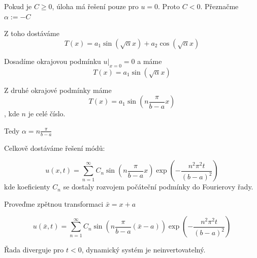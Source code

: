 \documentclass[../main.tex]{subfiles}
\begin{document}
\begin{example}
    Pokud je $C\geq 0$, úloha má řešení pouze pro $u=0$. Proto $C < 0$. Přeznačme $\alpha := -C$

    Z toho dostáváme 
    \begin{equation}
        T(x) = a_1 \sin(\sqrt{\alpha}x) + a_2 \cos(\sqrt{\alpha}x)
    \end{equation}

    Dosadíme okrajovou podmínku $u|_{x=0} = 0$ a máme 
    \begin{equation}
        T(x) = a_1 \sin(\sqrt{\alpha}x)
    \end{equation}

    Z druhé okrajové podmínky máme
    \begin{equation}
        T(x) = a_1 \sin(n\frac{\pi}{b-a}x)
    \end{equation},
    kde $n$ je celé číslo.
 
    Tedy $\alpha = n\frac{\pi}{b-a}$

    Celkově dostáváme řešení módů: 

    \begin{equation}
        u(x,t) = \sum_{n=1}^{\infty} C_n \sin(n\frac{\pi}{b-a}x) \exp(-\frac{n^2\pi^2t}{(b-a)^2})
    \end{equation}
    kde koeficienty $C_n$ se dostaly rozvojem počáteční podmínky do Fourierovy řady.

    Proveďme zpětnou transformaci $\bar{x}=x+a$
    
    \begin{equation}
        u(\bar{x},t) = \sum_{n=1}^{\infty} C_n \sin(n\frac{\pi}{b-a} (\bar{x} - a)) \exp(-\frac{n^2\pi^2t}{(b-a)^2})
    \end{equation}

    Řada diverguje pro $t<0$, dynamický systém je neinvertovatelný.
\end{example}
\end{document}
